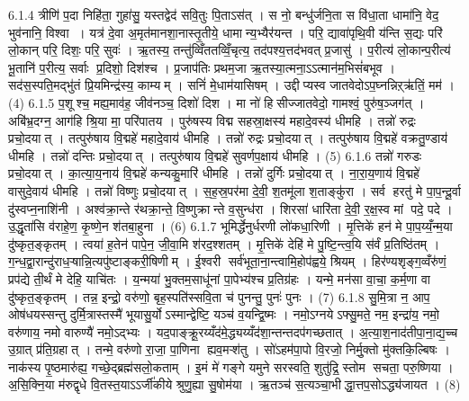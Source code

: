 6.1.4
त्रीणि॑ प॒दा निहि॑ता॒ गुहा॑सु॒ यस्तद्वेद॑ सवि॒तुः पि॒ताऽस॑त् । स नो॒ बन्धु॑र्जनि॒ता स वि॑धा॒ता धामा॑नि॒ वेद॒ भुव॑नानि॒ विश्वा । यत्र॑ दे॒वा अ॒मृत॑मानशा॒नास्तृ॒तीये॒ धामान्य॒भ्यैर॑यन्त । परि॒ द्यावा॑पृथि॒वी य॑न्ति स॒द्यः परि॑ लो॒कान् परि॒ दिशः॒ परि॒ सुवः॑ । ऋ॒तस्य॒ तन्तु॑व्विँततव्विँ॒चृत्य॒ तद॑पश्य॒त्तद॑भवत् प्र॒जासु॑ । प॒रीत्य॑ लो॒कान्प॒रीत्य॑ भू॒तानि॑ प॒रीत्य॒ सर्वाः प्र॒दिशो॒ दिश॑श्च । प्र॒जाप॑तिः प्रथम॒जा ऋ॒तस्या॒त्मना॒ऽऽत्मान॑म॒भिसं॑बभूव । सद॑स॒स्पति॒मद्भु॑तं प्रि॒यमिन्द्र॑स्य॒ काम्यम् । सनिं॑ मे॒धाम॑यासिषम् । उद्दीप्यस्व जातवेदोऽप॒घ्नन्निऱ्ऋ॑तिं॒ मम॑ । (4)
6.1.5
प॒शूश्च॒ मह्य॒माव॑ह॒ जीव॑नञ्च॒ दिशो॑ दिश । मा नो॑ हिसीज्जातवेदो॒ गामश्वं॒ पुरु॑ष॒ञ्जग॑त् । अबि॑भ्र॒दग्न॒ आग॑हि श्रि॒या मा॒ परि॑पातय । पुरु॑षस्य विद्म सहस्रा॒क्षस्य॑ महादे॒वस्य॑ धीमहि । तन्नो॑ रुद्रः प्रचो॒दयात् । तत्पुरु॑षाय वि॒द्महे॑ महादे॒वाय॑ धीमहि । तन्नो॑ रुद्रः प्रचो॒दयात् । तत्पुरु॑षाय वि॒द्महे॑ वक्रतु॒ण्डाय॑ धीमहि । तन्नो॑ दन्तिः प्रचो॒दयात् । तत्पुरु॑षाय वि॒द्महे॑ सुवर्णप॒क्षाय॑ धीमहि । (5)
6.1.6
तन्नो॑ गरुडः प्रचो॒दयात् । का॒त्या॒य॒नाय॑ वि॒द्महे॑ कन्यकु॒मारि॑ धीमहि । तन्नो॑ दुर्गिः प्रचो॒दयात् । ना॒रा॒य॒णाय॑ वि॒द्महे॑ वासुदे॒वाय॑ धीमहि । तन्नो॑ विष्णुः प्रचो॒दयात् । स॒ह॒स्र॒पर॑मा दे॒वी॒ श॒तमू॑ला श॒ताङ्कु॑रा । सर्व॑ हरतु॑ मे पा॒प॒न्दू॒र्वा दु॑स्वप्न॒नाशि॑नी । अश्व॑क्रा॒न्ते र॑थक्रा॒न्ते॒ वि॒ष्णुक्रान्ते व॒सुन्ध॑रा । शिरसा॑ धारि॑ता दे॒वी॒ र॒क्ष॒स्व मां पदे॒ पदे । उ॒द्धृता॑सि व॑राहे॒ण॒ कृ॒ष्णे॒न श॑तबा॒हुना । (6)
6.1.7
भूमिर्द्धेनुर्धरणी लो॑कधा॒रिणी । मृ॒त्तिके॑ हन॑ मे पा॒प॒य्यँ॒न्म॒या दु॑ष्कृत॒ङ्कृतम् । त्वया॑ ह॒तेन॑ पापे॒न॒ जी॒वा॒मि श॑रद॒श्शतम् । मृ॒त्तिके॑ देहि॑ मे पु॒ष्टि॒न्त्व॒यि स॑र्वं प्र॒तिष्ठि॑तम् । ग॒न्ध॒द्वा॒रान्दु॑राध॒ऱ्षान्नि॒त्यपु॑ष्टाङ्करी॒षिणीम् । ई॒श्वरी॑ सर्व॑भूता॒ना॒न्त्वामि॒होप॑ह्वये॒ श्रियम् । हिर॑ण्यशृङ्ग॒व्वँरु॑णं॒ प्रप॑द्ये ती॒र्थं मे देहि॒ याचि॑तः । य॒न्मया॑ भु॒क्तम॒साधू॑नां पा॒पेभ्य॑श्च प्र॒तिग्र॑हः । यन्मे॒ मन॑सा वा॒चा॒ क॒र्म॒णा वा दु॑ष्कृत॒ङ्कृतम् । तन्न॒ इन्द्रो॒ वरु॑णो॒ बृह॒स्पति॑स्सवि॒ता च॑ पुनन्तु॒ पुनः॑ पुनः । (7)
6.1.8
सु॒मि॒त्रा न॒ आप॒ ओष॑धयस्सन्तु दुर्मि॒त्रास्तस्मै॑ भूयासु॒र्योऽस्मान्द्वेष्टि॒ यञ्च॑ व॒यन्द्वि॒ष्मः । नमो॒ऽग्नयेऽफ्सु॒मते॒ नम॒ इन्द्रा॑य॒ नमो॒ वरु॑णाय॒ नमो वारुण्यै॑ नमो॒ऽद्भ्यः । यद॒पाङ्क्रू॒रय्यँद॑मे॒द्ध्यय्यँद॑शा॒न्तन्तदप॑गच्छतात् । अ॒त्या॒श॒नाद॑तीपा॒ना॒द्य॒च्च उ॒ग्रात् प्र॑ति॒ग्रहात् । तन्मे॒ वरु॑णो रा॒जा॒ पा॒णिना ह्यव॒मऱ्श॑तु । सो॑ऽहम॑पा॒पो वि॒रजो॒ निर्मु॒क्तो मु॑क्तकि॒ल्बिषः । नाक॑स्य पृ॒ष्ठमारु॑ह्य॒ गच्छे॒द्ब्रह्म॑सलो॒कताम् । इ॒मं मे॑ गङ्गे यमुने सरस्वति॒ शुतु॑द्रि॒ स्तोम॑ सचता॒ परु॒ष्णिया । अ॒सि॒क्नि॒या म॑रुद्वृधे वि॒तस्त॒याऽऽर्जी॑कीये श्रुणु॒ह्या सु॒षोम॑या । ऋ॒तञ्च॑ स॒त्यञ्चा॒भीद्धा॒त्तप॒सोऽद्ध्य॑जायत । (8)
